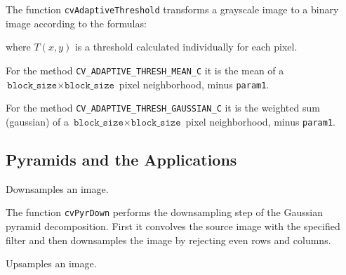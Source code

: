 The function \texttt{cvAdaptiveThreshold} transforms a grayscale image to a binary image according to the formulas:

\begin{description}
\end{description}

where $T(x,y)$ is a threshold calculated individually for each pixel.

For the method \texttt{CV\_ADAPTIVE\_THRESH\_MEAN\_C} it is the mean of a $\texttt{block\_size} \times \texttt{block\_size}$ pixel neighborhood, minus \texttt{param1}.

For the method \texttt{CV\_ADAPTIVE\_THRESH\_GAUSSIAN\_C} it is the weighted sum (gaussian) of a $\texttt{block\_size} \times \texttt{block\_size}$ pixel neighborhood, minus \texttt{param1}.

\subsection{Pyramids and the Applications}

\label{PyrDown}

Downsamples an image.


\begin{description}
\end{description}

The function \texttt{cvPyrDown} performs the downsampling step of the Gaussian pyramid decomposition. First it convolves the source image with the specified filter and then downsamples the image by rejecting even rows and columns.

\label{PyrUp}

Upsamples an image.


